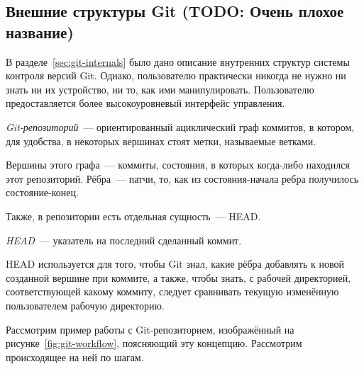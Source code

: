 \subsection{Внешние структуры Git (TODO: Очень плохое название)}

В разделе~\ref{sec:git-internals} было дано описание внутренних
структур системы контроля версий Git. Однако, пользователю практически
никогда не нужно ни знать ни их устройство, ни то, как ими
манипулировать. Пользователю предоставляется более высокоуровневый
интерфейс управления. 

%

\begin{definition}
  \emph{Git-репозиторий}~--- ориентированный ациклический граф
  коммитов, в котором, для удобства, в некоторых вершинах стоят метки,
  называемые ветками.
  
  Вершины этого графа~--- коммиты, состояния, в которых когда-либо
  находился этот репозиторий. Рёбра~--- патчи, то, как из
  состояния-начала ребра получилось состояние-конец.
\end{definition}


Также, в репозитории есть отдельная сущность~--- HEAD. 

\begin{definition}[HEAD]
  \emph{HEAD}~--- указатель на последний сделанный коммит.
\end{definition}

HEAD используется для того, чтобы Git знал, какие рёбра добавлять к
новой созданной вершине при коммите, а также, чтобы знать, с рабочей
директорией, соответствующей какому коммиту, следует сравнивать
текущую изменённую пользователем рабочую директорию.

Рассмотрим пример работы с Git-репозиторием, изображённый на
рисунке~\ref{fig:git-workflow}, поясняющий эту концепцию. Рассмотрим
происходящее на ней по шагам.

